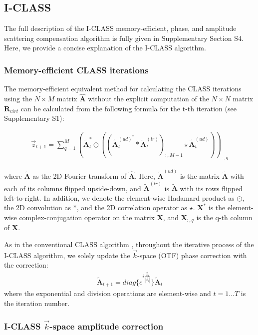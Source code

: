 \documentclass[pdflatex,sn-mathphys-num]{sn-jnl}%
\theoremstyle{thmstyleone}%
\theoremstyle{thmstyletwo}%
\theoremstyle{thmstylethree}%
\begin{document}
\subsection*{I-CLASS}
The full description of the I-CLASS memory-efficient, phase, and amplitude scattering compensation algorithm is fully given in Supplementary Section S4. Here, we provide a concise explanation of the I-CLASS algorithm.

\subsubsection*{Memory-efficient CLASS iterations}

The memory-efficient equivalent method for calculating the CLASS iterations using the $N \times M$ matrix $\hat{\textbf{A}}$ without the explicit computation of the $N \times N$ matrix $\textbf{R}_{virt}$ can be calculated from the following formula for the t-th iteration (see Supplementary S1): 

\begin{eqnarray}
\vec{z}_{t+1}=\sum_{q=1}^{M}(\tilde{\textbf{A}}_t^* \odot ((\tilde{\textbf{A}}_t^{(ud)^*}*\tilde{\textbf{A}}_t^{(lr)})_{:,M-1} \star \tilde{\textbf{A}}_t^{(ud)}))_{:,q}
\label{eq:three}
\end{eqnarray}

\noindent where $\tilde{\textbf{A}}$ as the 2D Fourier transform of $\hat{\textbf{A}}$. Here, $\tilde{\textbf{A}}^{(ud)}$ is the matrix $\tilde{\textbf{A}}$ with each of its columns flipped upside-down, and $\tilde{\textbf{A}}^{(lr)}$ is $\tilde{\textbf{A}}$ with its rows flipped left-to-right. In addition, we denote the element-wise Hadamard product as $\odot$, the 2D convolution as $*$, and the 2D correlation operator as $\star$. $\textbf{X}^{*}$ is the element-wise complex-conjugation operator on the matrix $\textbf{X}$, and $\textbf{X}_{:,q}$ is the q-th column of $\textbf{X}$.

As in the conventional CLASS algorithm \cite{kang17}, throughout the iterative process of the I-CLASS algorithm, we solely update the $\vec{k}$-space (OTF) phase correction with the correction:
\begin{eqnarray}
\tilde{\textbf{A}}_{t+1}=diag\{e^{i\frac{\vec{z}_t}{|\vec{z}_t|}}\}\tilde{\textbf{A}}_t
\end{eqnarray}
\noindent where the exponential and division operations are element-wise and $t=1...T$ is the iteration number. 
 \subsubsection*{I-CLASS $\vec{k}$-space amplitude correction}
\end{document}

